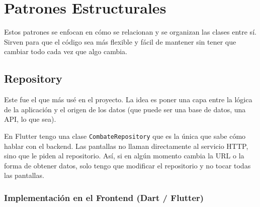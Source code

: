\documentclass{article}
\begin{document}
\section{Patrones Estructurales}
 
Estos patrones se enfocan en c\'omo se relacionan y se organizan las clases
entre s\'i. Sirven para que el c\'odigo sea m\'as flexible y f\'acil de mantener
sin tener que cambiar todo cada vez que algo cambia.
 
\subsection{Repository}
 
Este fue el que m\'as us\'e en el proyecto. La idea es poner una capa entre
la l\'ogica de la aplicaci\'on y el origen de los datos (que puede ser una
base de datos, una API, lo que sea).
 
En Flutter tengo una clase \texttt{CombateRepository} que es la \'unica
que sabe c\'omo hablar con el backend. Las pantallas no llaman directamente
al servicio HTTP, sino que le piden al repositorio. As\'i, si en alg\'un momento
cambia la URL o la forma de obtener datos, solo tengo que modificar el
repositorio y no tocar todas las pantallas.
 
\subsubsection*{Implementaci\'on en el Frontend (Dart / Flutter)}
 
\end{document}
